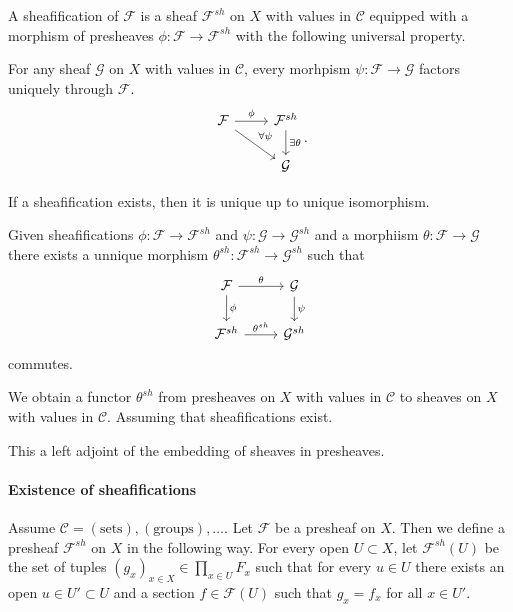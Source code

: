 \begin{definition}
	A sheafification of $\mathcal{F} $ is a sheaf $\mathcal{F}^{sh} $ on $X$ with values in $\mathcal{C} $ equipped with a morphism of presheaves $\phi: \mathcal{F}  \to \mathcal{F} ^{sh} $ with the following universal property. 

	For any sheaf $\mathcal{G} $ on $X$ with values in $\mathcal{C} $, every morhpism $\psi: \mathcal{F}  \to \mathcal{G} $ factors uniquely through $\mathcal{F} $.
	\[
	\begin{tikzcd}
		\mathcal{F} \arrow[r," \phi"] \arrow[dr, "\forall \psi"] & \mathcal{F} ^{sh} \arrow[d, "\exists \theta"]\\
					      & \mathcal{G} 
	\end{tikzcd}
	.\] 
\end{definition}
If a sheafification exists, then it is unique up to unique isomorphism.

Given sheafifications $\phi: \mathcal{F}  \to \mathcal{F} ^{sh}$ and $\psi: \mathcal{G}  \to \mathcal{G} ^{sh}$ and a morphiism $\theta: \mathcal{F}  \to \mathcal{G} $ there exists a unnique morphism $\theta^{sh}: \mathcal{F}^{sh} \to \mathcal{G} ^{sh} $
such that \[
\begin{tikzcd}
	\mathcal{F}  \arrow[r, "\theta"] \arrow[d,"\phi"] & \mathcal{G} \arrow[d, "\psi"] \\
	\mathcal{F} ^{sh} \arrow[r, "\theta^{sh}"] & \mathcal{G} ^{sh}
\end{tikzcd}
\] 
commutes.

We obtain a functor $\theta^{sh}$ from presheaves on $X$ with values in $\mathcal{C}  $ to sheaves on $X$ with values in $\mathcal{C} $.  Assuming that sheafifications exist.

This a left adjoint of the embedding of sheaves in presheaves.

\paragraph{Existence of sheafifications}
Assume $\mathcal{C}  = (\text{sets}), (\text{groups}),\ldots$.
Let $\mathcal{F} $ be a presheaf on $X$. 
Then we define a presheaf $\mathcal{F} ^{sh}$ on $X$ in the following way. 
For every open $U \subset X$, let $\mathcal{F} ^{sh}(U)$ be the set of tuples
$(g_x)_{x \in X} \in \prod_{x \in U}F_x$ such that for every $u \in U$ there exists an open $u \in U' \subset U$ and a section $f \in \mathcal{F}(U) $ such that $g_x = f_x$ for all $x \in U'$. 

